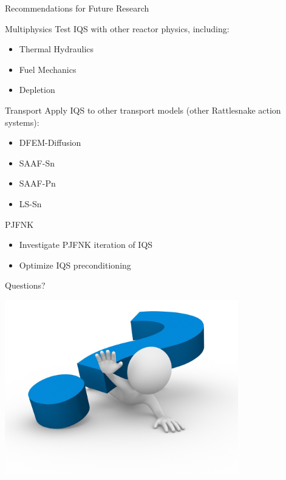 \documentclass[8pt,xcolor=dvipnames]{beamer}
\begin{document}
\begin{frame}{Recommendations for Future Research}

\begin{block}{Multiphysics}
Test IQS with other reactor physics, including:
\begin{itemize}
\item Thermal Hydraulics
\item Fuel Mechanics
\item Depletion
\end{itemize}
\end{block}

\begin{block}{Transport}
Apply IQS to other transport models (other Rattlesnake action systems):
\begin{itemize}
\item DFEM-Diffusion
\item SAAF-Sn
\item SAAF-Pn
\item LS-Sn
\end{itemize}
\end{block}

\begin{block}{PJFNK}
\begin{itemize}
\item Investigate PJFNK iteration of IQS
\item Optimize IQS preconditioning
\end{itemize}
\end{block}

\end{frame}

\begin{frame}{Questions?}

\centering
\includegraphics[width=\linewidth,height=3in,keepaspectratio]{figures/question_mark.jpg}

\end{frame}
\end{document}
